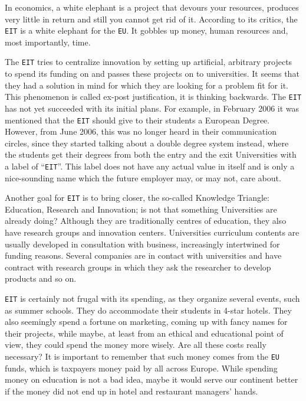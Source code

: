 \documentclass[11pt,a4paper,oneside,twocolumn]{IEEEtran}
\begin{document}
In economics, a white elephant is a project that devours your resources, produces very little in return and still you cannot get rid of it. According to its critics, the \texttt{EIT} is a white elephant for the \texttt{EU}. It gobbles up money, human resources and, most importantly, time.

The \texttt{EIT} tries to centralize innovation by setting up artificial, arbitrary projects to spend its funding on and passes these projects on to universities. It seems that they had a solution in mind for which they are looking for a problem fit for it. This phenomenon is called ex-post justification, it is thinking backwards. The \texttt{EIT} has not yet succeeded with its initial plans. For example, in February 2006 it was mentioned that the \texttt{EIT} should give to their students a European Degree\cite{5_4}. However, from June 2006, this was no longer heard in their communication circles, since they started talking about a double degree system instead, where the students get their degrees from both the entry and the exit Universities with a label of ``\texttt{EIT}''\cite{3_5}. This label does not have any actual value in itself and is only a nice-sounding name which the future employer may, or may not, care about.

Another goal for \texttt{EIT} is to bring closer, the so-called Knowledge Triangle: Education, Research and Innovation; is not that something Universities are already doing? Although they are traditionally centres of education, they also have research groups and innovation centers. Universities curriculum contents are usually developed in consultation with business, increasingly intertwined for funding reasons. Several companies are in contact with universities and have contract with research groups in which they ask the researcher to develop products and so on.

\texttt{EIT} is certainly not frugal with its spending, as they organize several events, such as summer schools. They do accommodate their students in 4-star hotels. They also seemingly spend a fortune on marketing, coming up with fancy names for their projects, while maybe, at least from an ethical and educational point of view, they could spend the money more wisely. Are all these costs really necessary? It is important to remember that such money comes from the \texttt{EU} funds, which is taxpayers money paid by all across Europe. While spending money on education is not a bad idea, maybe it would serve our continent better if the money did not end up in hotel and restaurant managers' hands.
\end{document}
